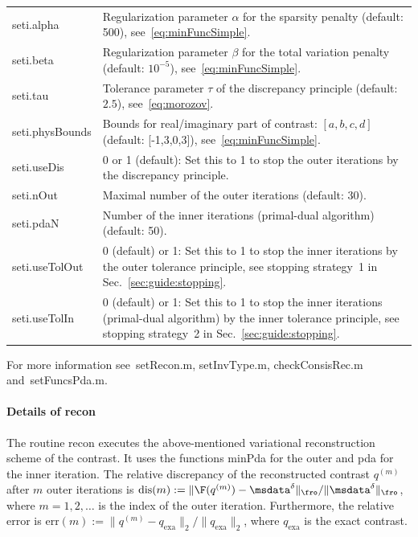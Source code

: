 \documentclass[a4paper]{article}
\begin{document}
\noindent\begin{tabular}[t]{p{2.3cm} p{13.3cm}}
\textsf{seti.alpha} & Regularization parameter $\alpha$ for the sparsity penalty (default: 500), see~\eqref{eq:minFuncSimple}.\\
\textsf{seti.beta} & Regularization parameter $\beta$ for the total variation penalty (default: $10^{-5}$), see~\eqref{eq:minFuncSimple}.\\
\textsf{seti.tau} & Tolerance parameter $\tau$ of the discrepancy principle (default: $2.5$), see~\eqref{eq:morozov}.\\
\textsf{seti.physBounds} & Bounds for real/imaginary part of contrast: $[a, b, c, d]$ (default: [-1,3,0,3]), see~\eqref{eq:minFuncSimple}.\\
\textsf{seti.useDis} & 0 or 1 (default): Set this to 1 to stop the outer iterations by the discrepancy principle.\\
\textsf{seti.nOut} & Maximal number of the outer iterations (default: 30).\\
\textsf{seti.pdaN} & Number of the inner iterations (primal-dual algorithm) (default: 50).\\
\textsf{seti.useTolOut} & 0 (default) or 1: Set this to 1 to stop the inner iterations by the outer tolerance principle, see stopping strategy~1 in Sec.~\ref{sec:guide:stopping}.\\
\textsf{seti.useTolIn} & 0 (default) or 1: Set this to 1 to stop the inner iterations (primal-dual algorithm) by the inner tolerance principle, see stopping strategy~2 in Sec.~\ref{sec:guide:stopping}.
\end{tabular}

For more information see~\textsf{setRecon.m}, \textsf{setInvType.m}, \textsf{checkConsisRec.m} and~\textsf{setFuncsPda.m}.

\paragraph{Details of \textsf{recon}} The routine \textsf{recon} executes the above-mentioned variational reconstruction scheme of the contrast. It uses the functions \textsf{minPda} for the outer and \textsf{pda} for the inner iteration. The relative discrepancy of the reconstructed contrast $q^{(m)}$ after $m$ outer iterations is $\mathrm{dis}(m):= \|\F(q^{(m)})-\msdata^\delta\|_\fro / \|\msdata^\delta\|_\fro$, where $m = 1, 2, \ldots$ is the index of the outer iteration. Furthermore, the relative error is $\mathrm{err}(m) := \|q^{(m)}-q_\mathrm{exa}\|_2 / \|q_\mathrm{exa}\|_2$, where $q_\mathrm{exa}$ is the exact contrast.
\end{document}
